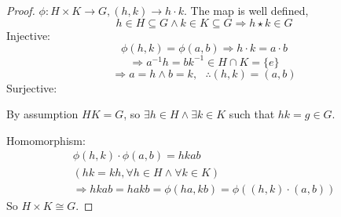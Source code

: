 \documentclass[12pt]{article}
\begin{document}
\begin{proof}
    \(\phi: H \times K \to G, (h,k) \to h \cdot k\). 
    The map is well defined, 
    \[
        h \in H \subseteq G \land k \in K \subseteq G 
        \Rightarrow h\star k \in G
    \]
    Injective: 
    \[ 
        \phi(h,k) = \phi(a,b) \Rightarrow 
        h \cdot k = a \cdot b 
    \]
    \[ 
        \Rightarrow a^{-1}h = bk^{-1} \in H \cap K = \{e\} 
    \]
    \[ 
        \Rightarrow a = h \land b = k, \text{ } 
        \therefore \boxed{(h,k) = (a,b)}
    \]
    Surjective: 
    
    \noindent  
    By assumption \(HK = G\), so \(\exists h\in H \land \exists k 
    \in K\) such that \(hk = g \in G\).

    \noindent 
    Homomorphism: 
    \begin{gather*}
        \phi(h,k) \cdot \phi(a,b) = hkab \\ 
        \left( hk=kh, \forall h \in H \land \forall k \in K\right) \\ 
        \Rightarrow hkab = hakb = \phi(ha, kb) 
        = \phi((h,k) \cdot (a,b))
    \end{gather*}
    So \(H\times K \cong G\).
\end{proof}
    
\end{document}
